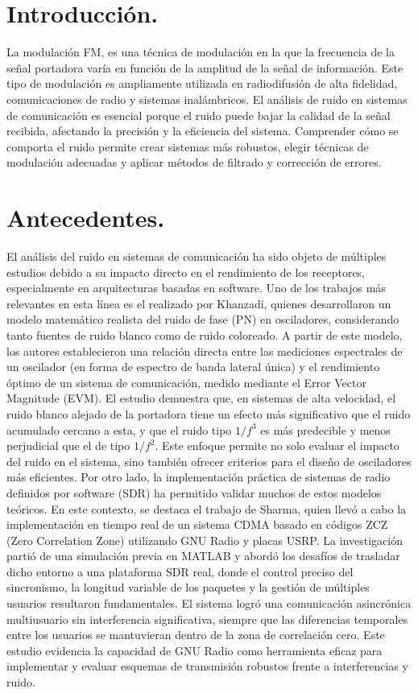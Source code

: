 \documentclass[conference]{IEEEtran}
\begin{document}
	\section{Introducción.}
	La modulación FM, es una técnica de modulación en la que la frecuencia de la señal portadora varía en función de la amplitud de la señal de información. Este tipo de modulación es ampliamente utilizada en radiodifusión de alta fidelidad, comunicaciones de radio y sistemas inalámbricos.
	El análisis de ruido en sistemas de comunicación es esencial porque el ruido puede bajar la calidad de la señal recibida, afectando la precisión y la eficiencia del sistema. Comprender cómo se comporta el ruido permite crear sistemas más robustos, elegir técnicas de modulación adecuadas y aplicar métodos de filtrado y corrección de errores.
	\section{Antecedentes.}
	El análisis del ruido en sistemas de comunicación ha sido objeto de múltiples estudios debido a su impacto directo en el rendimiento de los receptores, especialmente en arquitecturas basadas en software. Uno de los trabajos más relevantes en esta línea es el realizado por Khanzadi, quienes desarrollaron un modelo matemático realista del ruido de fase (PN) en osciladores, considerando tanto fuentes de ruido blanco como de ruido coloreado. A partir de este modelo, los autores establecieron una relación directa entre las mediciones espectrales de un oscilador (en forma de espectro de banda lateral única) y el rendimiento óptimo de un sistema de comunicación, medido mediante el Error Vector Magnitude (EVM). El estudio demuestra que, en sistemas de alta velocidad, el ruido blanco alejado de la portadora tiene un efecto más significativo que el ruido acumulado cercano a esta, y que el ruido tipo $1/f^3$ es más predecible y menos perjudicial que el de tipo $1/f^2$. Este enfoque permite no solo evaluar el impacto del ruido en el sistema, sino también ofrecer criterios para el diseño de osciladores más eficientes.
	Por otro lado, la implementación práctica de sistemas de radio definidos por software (SDR) ha permitido validar muchos de estos modelos teóricos. En este contexto, se destaca el trabajo de Sharma, quien llevó a cabo la implementación en tiempo real de un sistema CDMA basado en códigos ZCZ (Zero Correlation Zone) utilizando GNU Radio y placas USRP. La investigación partió de una simulación previa en MATLAB y abordó los desafíos de trasladar dicho entorno a una plataforma SDR real, donde el control preciso del sincronismo, la longitud variable de los paquetes y la gestión de múltiples usuarios resultaron fundamentales. El sistema logró una comunicación asincrónica multiusuario sin interferencia significativa, siempre que las diferencias temporales entre los usuarios se mantuvieran dentro de la zona de correlación cero. Este estudio evidencia la capacidad de GNU Radio como herramienta eficaz para implementar y evaluar esquemas de transmisión robustos frente a interferencias y ruido.
	
\end{document}
